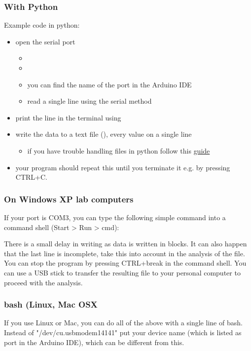 \subsubsection{With Python}

Example code in python:
\begin{itemize}
	\item open the serial port
	\begin{itemize}
		\item {}
		\item {}
		\item you can find the name of the port in the Arduino \ac{IDE}
		\item read a single line using the serial method   
	\end{itemize}
	\item print the line in the terminal using 
	\item write the data to a text file (), every value on a single line
	\begin{itemize}
		\item if you have trouble handling files in python follow this \href{http://www.pythonforbeginners.com/files/reading-and-writing-files-in-python}{guide}
	\end{itemize}
	\item your program should repeat this until you terminate it e.g. by pressing CTRL+C.
\end{itemize}

\subsubsection{On Windows XP lab computers}

If your port is COM3, you can type the following simple command into a command shell (Start > Run > cmd):


There is a small delay in writing as data is written in blocks. It can also happen that the last line is incomplete, take this into account in the analysis of the file. You can stop the program by pressing CTRL+break in the command shell. You can use a USB stick to transfer the resulting file to your personal computer to proceed with the analysis.

\subsubsection{bash (Linux, Mac OSX}
If you use Linux or Mac, you can do all of the above with a single line of bash. Instead of "/dev/cu.usbmodem14141" put your device name (which is listed as port in the Arduino IDE), which can be different from this.

